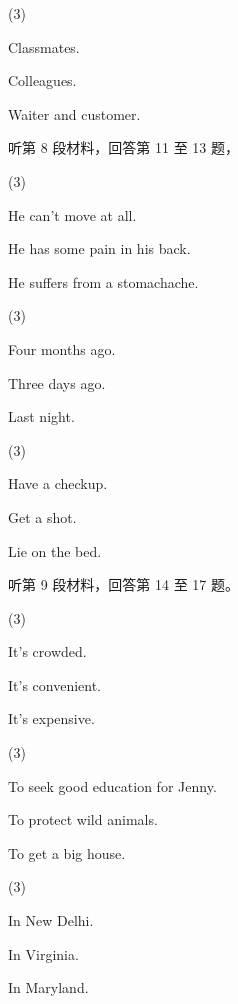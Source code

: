 \documentclass{英语试卷}
\begin{document}
\begin{choices}(3)
  \item Classmates.
  \item Colleagues.
  \item Waiter and customer.
\end{choices}
\par 听第 8 段材料，回答第 11 至 13 题，\par
{}
\begin{choices}(3)
  \item He can't move at all.
  \item He has some pain in his back.
  \item He suffers from a stomachache.
\end{choices}
\begin{choices}(3)
  \item Four months ago.
  \item Three days ago.
  \item Last night.
\end{choices}
\begin{choices}(3)
  \item Have a checkup.
  \item Get a shot.
  \item Lie on the bed.
\end{choices}
\par 听第 9 段材料，回答第 14 至 17 题。\par
{}
\begin{choices}(3)
  \item It's crowded.
  \item It's convenient.
  \item It's expensive.
\end{choices}
\begin{choices}(3)
  \item To seek good education for Jenny.
  \item To protect wild animals.
  \item To get a big house.
\end{choices}
\begin{choices}(3)
  \item In New Delhi.
  \item In Virginia.
  \item In Maryland.
\end{choices}
\end{document}
